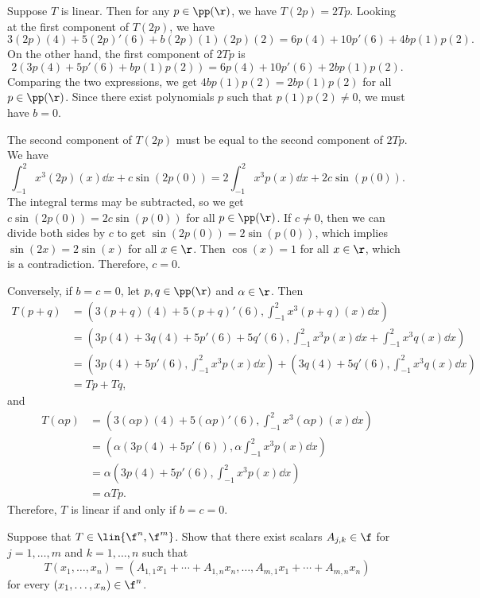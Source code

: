 \begin{sol}
    Suppose $T$ is linear. Then for any $p \in \pp(\r)$, we have $T(2p) = 2Tp$. Looking at the first component of $T(2p)$, we have
    \[3(2p)(4) + 5(2p)'(6) + b(2p)(1)(2p)(2) = 6p(4) + 10p'(6) + 4bp(1)p(2).\]
    On the other hand, the first component of $2Tp$ is
    \[2(3p(4) + 5p'(6) + bp(1)p(2)) = 6p(4) + 10p'(6) + 2bp(1)p(2).\]
    Comparing the two expressions, we get $4bp(1)p(2) = 2bp(1)p(2)$ for all $p \in \pp(\r)$. Since there exist polynomials $p$ such that $p(1)p(2) \neq 0$, we must have $b = 0$.

    The second component of $T(2p)$ must be equal to the second component of $2Tp$. We have
    \[\int_{-1}^{2} x^3 (2p)(x) \dd x + c \sin(2p(0)) = 2\int_{-1}^{2} x^3 p(x) \dd x + 2c \sin (p(0)).\]
    The integral terms may be subtracted, so we get $c \sin(2p(0)) = 2c \sin(p(0))$ for all $p \in \pp(\r)$. If $c \neq 0$, then we can divide both sides by $c$ to get $\sin(2p(0)) = 2\sin(p(0))$, which implies $\sin(2x) = 2\sin(x)$ for all $x \in \r$. Then $\cos(x) = 1$ for all $x \in \r$, which is a contradiction. Therefore, $c = 0$.

    Conversely, if $b = c = 0$, let $p, q \in \pp(\r)$ and $\alpha \in \r$. Then
    \begin{align*}
        T(p + q) & = \left(3(p + q)(4) + 5(p + q)'(6), \int_{-1}^{2} x^3 (p + q)(x) \dd x\right) \\
        & = \left(3p(4) + 3q(4) + 5p'(6) + 5q'(6), \int_{-1}^{2} x^3 p(x) \dd x + \int_{-1}^{2} x^3 q(x) \dd x\right) \\
        & = \left(3p(4) + 5p'(6), \int_{-1}^{2} x^3 p(x) \dd x\right) + \left(3q(4) + 5q'(6), \int_{-1}^{2} x^3 q(x) \dd x\right) \\
        & = Tp + Tq,
    \end{align*}
    and
    \begin{align*}
        T(\alpha p) & = \left(3(\alpha p)(4) + 5(\alpha p)'(6), \int_{-1}^{2} x^3 (\alpha p)(x) \dd x\right) \\
        & = \left(\alpha (3p(4) + 5p'(6)), \alpha \int_{-1}^{2} x^3 p(x) \dd x\right) \\
        & = \alpha\left(3p(4) + 5p'(6), \int_{-1}^{2} x^3 p(x) \dd x\right) \\
        & = \alpha Tp.
    \end{align*}
    Therefore, $T$ is linear if and only if $b = c = 0$.
\end{sol}

\begin{exercise}[3a3]
    Suppose that $T \in \lin{\f^n, \f^m}$. Show that there exist scalars $A_{j, k} \in \f$ for $j = 1, \ldots, m$ and $k = 1, \ldots, n$ such that
    \[T(x_1, \ldots, x_n) = (A_{1,1} x_1 + \cdots + A_{1, n} x_n, \ldots, A_{m, 1} x_1 + \cdots + A_{m, n} x_n)\]
    for every $(x_1, \ldots, x_n) \in \f^n$.
\end{exercise}

